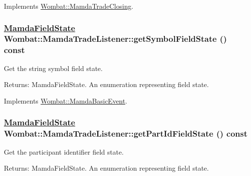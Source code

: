 Implements \hyperlink{classWombat_1_1MamdaTradeClosing_1cc09c62280886142698dcafaef84660}{Wombat::Mamda\-Trade\-Closing}.\hypertarget{classWombat_1_1MamdaTradeListener_ddcc8f4fae7a6d944ccc4021fd5ac492}{
\subsubsection[getSymbolFieldState]{\setlength{\rightskip}{0pt plus 5cm}\hyperlink{namespaceWombat_93aac974f2ab713554fd12a1fa3b7d2a}{Mamda\-Field\-State} Wombat::Mamda\-Trade\-Listener::get\-Symbol\-Field\-State () const}}
\label{classWombat_1_1MamdaTradeListener_ddcc8f4fae7a6d944ccc4021fd5ac492}


Get the string symbol field state. 

\begin{Desc}
\item[Returns:]Mamda\-Field\-State. An enumeration representing field state. \end{Desc}


Implements \hyperlink{classWombat_1_1MamdaBasicEvent_ef95e19f4babb0e5ea8549d6cf29d13f}{Wombat::Mamda\-Basic\-Event}.\hypertarget{classWombat_1_1MamdaTradeListener_0ebdcf5fd43af5725690bf4ed5bdf0d1}{
\subsubsection[getPartIdFieldState]{\setlength{\rightskip}{0pt plus 5cm}\hyperlink{namespaceWombat_93aac974f2ab713554fd12a1fa3b7d2a}{Mamda\-Field\-State} Wombat::Mamda\-Trade\-Listener::get\-Part\-Id\-Field\-State () const}}
\label{classWombat_1_1MamdaTradeListener_0ebdcf5fd43af5725690bf4ed5bdf0d1}


Get the participant identifier field state. 

\begin{Desc}
\item[Returns:]Mamda\-Field\-State. An enumeration representing field state. \end{Desc}


